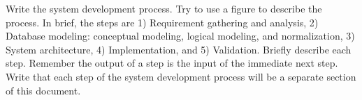 Write the system development process. Try to use a figure to describe the process. In brief, the  steps are 1) Requirement gathering and analysis, 2) Database modeling: conceptual modeling, logical modeling, and normalization, 3) System architecture, 4) Implementation, and 5) Validation. Briefly describe each step. Remember the output of a step is the  input of the immediate next step. Write that each step of the system development process will be a separate section of this document.
\begin{comment}


To design a database, one should follow the following steps:
\begin{enumerate}
\item Requirement analysis
	\begin{itemize}
		\item[-] interviewing, documentation, etc .
	\end{itemize}

\item Mapping onto a conceptual model (conceptual design)
     \begin{itemize}
     	\item[-] ER model
     \end{itemize}
\item Mapping onto a data model (logical design)
	\begin{itemize}
     	\item[-] Relational model, object model etc. 
     \end{itemize}
\item Normalization
\item System Architecture
\item Realization and Implementation (physical design)    
    
\end{enumerate}
\end{comment}



